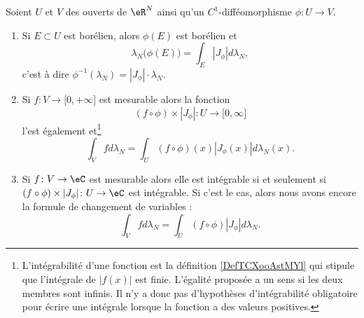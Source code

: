 \begin{theorem}         \label{THOooUMIWooZUtUSg}
    Soient \( U\) et \( V\) des ouverts de \( \eR^N\) ainsi qu'un \( C^1\)-difféomorphisme \(\phi\colon U\to V\).
    \begin{enumerate}
        \item   \label{ItemVWYDooOzwnyfi}
            Si \( E\subset U\) est borélien, alors \( \phi(E)\) est borélien et
            \begin{equation}
                \lambda_N\big( \phi(E) \big)=\int_E| J_{\phi} |d\lambda_N,
            \end{equation}
            c'est à dire \( \phi^{-1}(\lambda_N)=| J_{\phi} |\cdot \lambda_N\).
        \item       \label{ITEMooEZUBooGBuDOS}
            Si \( f\colon V\to \mathopen[ 0 , +\infty \mathclose]\) est mesurable alors la fonction
            \begin{equation}
                (f\circ\phi)\times | J_{\phi} |\colon U\to \mathopen[ 0 , \infty \mathclose]
            \end{equation}
            l'est également et\footnote{L'intégrabilité d'une fonction est la définition \ref{DefTCXooAstMYl} qui stipule que l'intégrale de \( | f(x) |\) est finie. L'égalité proposée a un sens si les deux membres sont infinis. Il n'y a donc pas d'hypothèses d'intégrabilité obligatoire pour écrire une intégrale lorsque la fonction a des valeurs positives.}
            \begin{equation}        \label{EqRANEooQsFhbC}
                \int_Vfd\lambda_N=\int_U(f\circ\phi)(x)| J_{\phi}(x) |d\lambda_N(x).
            \end{equation}
        \item       \label{ITEMooAJGDooGHKnvj}
            Si \( f\colon V\to \eC\) est mesurable alors elle est intégrable si et seulement si \( (f\circ \phi)\times | J_{\phi} |\colon U\to \eC\) est intégrable. Si c'est le cas, alors nous avons encore la formule de changement de variables :
            \begin{equation}        \label{EQooLYAWooTArAZR}
                \int_Vfd\lambda_N=\int_U (f\circ \phi)| J_{\phi} |d\lambda_N.
            \end{equation}
    \end{enumerate}
\end{theorem}


